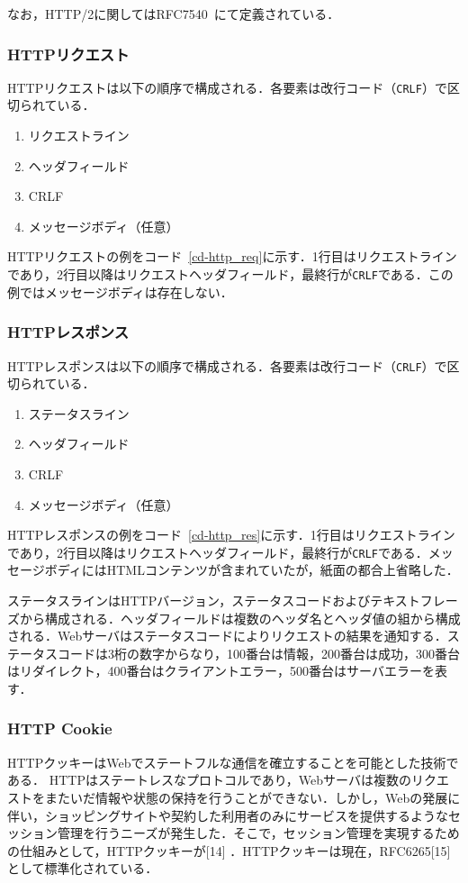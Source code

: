 なお，HTTP/2に関してはRFC7540~\cite{rfc7540}にて定義されている．
\subsubsection{HTTPリクエスト}
HTTPリクエストは以下の順序で構成される．各要素は改行コード（\texttt{CRLF}）で区切られている．
\begin{enumerate}
\item リクエストライン
\item ヘッダフィールド
\item CRLF
\item メッセージボディ（任意）
\end{enumerate}
HTTPリクエストの例をコード~\ref{cd-http_req}に示す．1行目はリクエストラインであり，2行目以降はリクエストヘッダフィールド，最終行が\texttt{CRLF}である．この例ではメッセージボディは存在しない．

\subsubsection{HTTPレスポンス}
HTTPレスポンスは以下の順序で構成される．各要素は改行コード（\texttt{CRLF}）で区切られている．
\begin{enumerate}
\item ステータスライン
\item ヘッダフィールド
\item CRLF
\item メッセージボディ（任意）
\end{enumerate}
HTTPレスポンスの例をコード~\ref{cd-http_res}に示す．1行目はリクエストラインであり，2行目以降はリクエストヘッダフィールド，最終行が\texttt{CRLF}である．メッセージボディにはHTMLコンテンツが含まれていたが，紙面の都合上省略した．

ステータスラインはHTTPバージョン，ステータスコードおよびテキストフレーズから構成される．ヘッダフィールドは複数のヘッダ名とヘッダ値の組から構成される．Webサーバはステータスコードによりリクエストの結果を通知する．ステータスコードは3桁の数字からなり，100番台は情報，200番台は成功，300番台はリダイレクト，400番台はクライアントエラー，500番台はサーバエラーを表す．
\subsubsection{HTTP Cookie}
HTTPクッキーはWebでステートフルな通信を確立することを可能とした技術である．
HTTPはステートレスなプロトコルであり，Webサーバは複数のリクエストをまたいだ情報や状態の保持を行うことができない．しかし，Webの発展に伴い，ショッピングサイトや契約した利用者のみにサービスを提供するようなセッション管理を行うニーズが発生した．そこで，セッション管理を実現するための仕組みとして，HTTPクッキーが[14] ．HTTPクッキーは現在，RFC6265[15] として標準化されている． 


